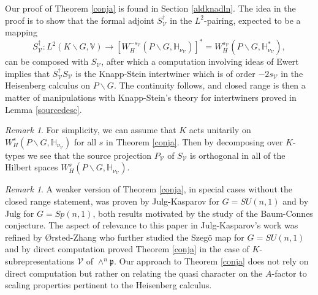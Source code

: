 \documentclass[a4paper,reqno]{amsart}
\numberwithin{equation}{section}
\theoremstyle{definition}
\theoremstyle{remark}
\newtheorem{remark}[thm]{Remark}
\begin{document}
Our proof of Theorem \ref{conja} is found in Section \ref{aldknadln}. The idea in the proof is to show that the formal adjoint $S_{\mathcal{V}}^\dagger$ in the $L^2$-pairing, expected to be a mapping
$$S_{\mathcal{V}}^\dagger:L^2(K \backslash G,\mathbb{V})\to [W^{-s_\mathcal{V}}_{H}(P\backslash G, \mathbb{H}_{\nu_{\mathcal{V}}})]^*=W^{s_\mathcal{V}}_{H}(P\backslash G, \mathbb{H}_{\nu_{\mathcal{V}}}^*),$$ 
can be composed with $S_{\mathcal{V}}$, after which a computation involving ideas of Ewert \cite{ewertfixed} implies that $S_{\mathcal{V}}^\dagger S_{\mathcal{V}}$ is the Knapp-Stein intertwiner which is of order $-2s_\mathcal{V}$ in the Heisenberg calculus on $P\backslash G$. The continuity follows, and closed range is then a matter of manipulations with Knapp-Stein's theory for intertwiners \cite{knappstein} proved in Lemma \ref{sourcedesc}. 

\begin{remark}
For simplicity, we can assume that $K$ acts unitarily on $W^{s}_{H}(P\backslash G, \mathbb{H}_{\nu_{\mathcal{V}}})$ for all $s$ in Theorem \ref{conja}. Then by decomposing over $K$-types we see that the source projection $P_{\mathcal{V}}$ of $S_{\mathcal{V}}$ is orthogonal in all of the Hilbert spaces $W^{s}_{H}(P\backslash G, \mathbb{H}_{\nu_{\mathcal{V}}})$. 
\end{remark}

\begin{remark}
A weaker version of Theorem \ref{conja}, in special cases without the closed range statement, was proven by Julg-Kasparov \cite{julgkasp} for $G=SU(n,1)$ and by Julg \cite{julghow} for $G=Sp(n,1)$, both results motivated by the study of the Baum-Connes conjecture. The aspect of relevance to this paper in Julg-Kasparov's work \cite{julgkasp} was refined by Ørsted-Zhang \cite{orschang05} who further studied the Szegö map for $G=SU(n,1)$ and by direct computation proved Theorem \ref{conja} in the case of $K$-subrepresentations $\mathcal{V}$ of $\wedge^n\mathfrak{p}$. Our approach to Theorem \ref{conja} does not rely on direct computation but rather on relating the quasi character on the $A$-factor to scaling properties pertinent to the Heisenberg calculus.
\end{remark}
\end{document}
